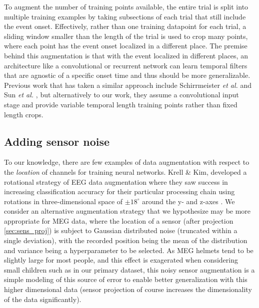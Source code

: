 \documentclass[fleqn,10pt]{wlscirep}
\begin{document}
To augment the number of training points available, the entire trial is split into multiple training examples by taking subsections of each trial that still include the event onset. Effectively, rather than one training datapoint for each trial, a sliding window smaller than the length of the trial is used to crop many points, where each point has the event onset localized in a different place. The premise behind this augmentation is that with the event localized in different places, an architecture like a convolutional or recurrent network can learn temporal filters that are agnostic of a specific onset time and thus should be more generalizable. Previous work that has taken a similar approach include Schirrmeister {\em et al.} \cite{Schirrmeister2017} and Sun {\em et al.} \cite{Sun}, but alternatively to our work, they assume a convolutional input stage and provide variable temporal length training points rather than fixed length crops. %



\subsection*{Adding sensor noise}

To our knowledge, there are few examples of data augmentation with respect to the {\em location} of channels for training neural networks. Krell \& Kim, developed a rotational strategy of EEG data augmentation where they saw success in increasing classification accuracy for their particular processing chain using rotations in three-dimensional space of $\pm 18^{\circ}$ around the y- and z-axes \cite{Krell2017}. We consider an alternative augmentation strategy that we hypothesize may be more appropriate for MEG data, where the location of a sensor (after projection \ref{sec:sens_proj}) is subject to Gaussian distributed noise (truncated within a single deviation), with the recorded position being the mean of the distribution and variance being a hyperparameter to be selected. As MEG helmets tend to be slightly large for most people, and this effect is exagerated when considering small children such as in our primary dataset, this noisy sensor augmentation is a simple modeling of this source of error to enable better generalization with this higher dimensional data (sensor projection of course increases the dimensionality of the data significantly).
\end{document}
